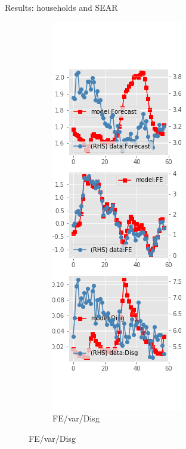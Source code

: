 \documentclass{beamer}
\begin{document}
\begin{frame}{Results: households and SEAR}
\begin{figure}[ht]
\begin{subfigure}[b]{0.19\textwidth}
\end{subfigure}
\hfill
\begin{subfigure}[b]{0.19\textwidth}
	\caption{FE/var/Disg}
	\includegraphics[width=\textwidth, height = 0.8\textheight]{figuresDraft/sce_se_est_diag4.png}
\end{subfigure}
\end{figure}
\end{frame}
\end{document}
